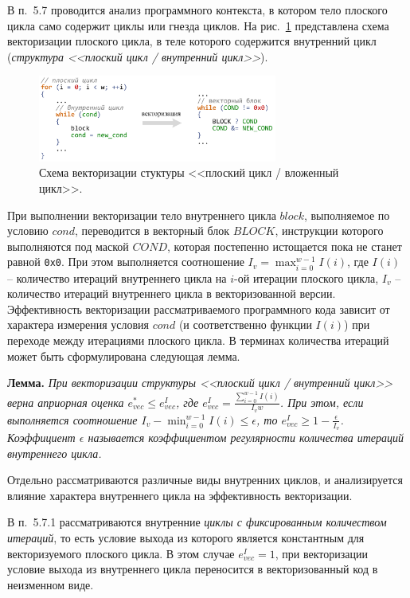 \documentclass[a4paper,14pt]{extarticle}                     %
\theoremstyle{plain}                                         %
\begin{document}
В п.~5.7 проводится анализ программного контекста, в котором тело плоского цикла само содержит циклы или гнезда циклов.
На рис.~\ref{fig:vec_flat_loop_nest} представлена схема векторизации плоского цикла, в теле которого содержится внутренний цикл (\textit{структура <<плоский цикл / внутренний цикл>>}).

\begin{figure}[!ht]
\centering
\includegraphics[width=0.7\textwidth]{./fig/vec_flat_loop_nest.pdf}
\singlespacing
\caption{Схема векторизации стуктуры <<плоский цикл / вложенный цикл>>.}
\label{fig:vec_flat_loop_nest}
\end{figure}

При выполнении векторизации тело внутреннего цикла $block$, выполняемое по условию $cond$, переводится в векторный блок $BLOCK$, инструкции которого выполняются под маской $COND$, которая постепенно истощается пока не станет равной \texttt{0x0}.
При этом выполняется соотношение $I_v = \max_{i = 0}^{w - 1}{I(i)}$, где $I(i)$ -- количество итераций внутреннего цикла на $i$-ой итерации плоского цикла, $I_v$ -- количество итераций внутреннего цикла в векторизованной версии.
Эффективность векторизации рассматриваемого программного кода зависит от характера измерения условия $cond$ (и соответственно функции $I(i)$) при переходе между итерациями плоского цикла.
В терминах количества итераций может быть сформулирована следующая лемма.

\textbf{Лемма.} \textit{При векторизации структуры <<плоский цикл / внутренний цикл>> верна априорная оценка $e_{vec}^{*} \le e_{vec}^I$, где $e_{vec}^I = \frac{\sum_{i = 0}^{w - 1}{I(i)}}{I_v w}$.
При этом, если выполняется соотношение $I_v - \min_{i = 0}^{w - 1}{I(i)} \le \epsilon$, то $e_{vec}^I \ge 1 - \frac{\epsilon}{I_v}$. Коэффициент $\epsilon$ называется коэффициентом регулярности количества итераций внутреннего цикла.}

Отдельно рассматриваются различные виды внутренних циклов, и анализируется влияние характера внутреннего цикла на эффективность векторизации.

В п.~5.7.1 рассматриваются внутренние \textit{циклы с фиксированным количеством итераций}, то есть условие выхода из которого является константным для векторизуемого плоского цикла.
В этом случае $e_{vec}^I = 1$, при векторизации условие выхода из внутреннего цикла переносится в векторизованный код в неизменном виде.
\end{document}
